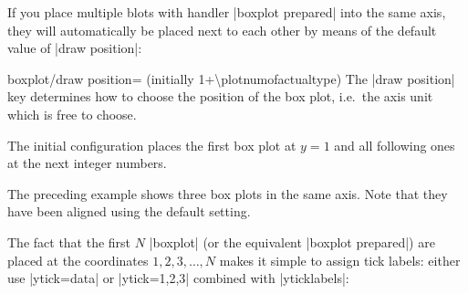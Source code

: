	If you place multiple blots with handler |boxplot prepared| into the same axis, they will automatically be placed next to each other by means of the default value of |draw position|:


\begin{pgfplotskey}{boxplot/draw position= (initially 1+\textbackslash plotnumofactualtype)}
	The |draw position| key determines how to choose the position of the box plot, i.e.\ the axis unit which is free to choose.

	The initial configuration places the first box plot at $y=1$ and all following ones at the next integer numbers.
\begin{codeexample}[]
\end{codeexample}
	The preceding example shows three box plots in the same axis. Note that they have been aligned using the default setting.

	The fact that the first $N$ |boxplot| (or the equivalent |boxplot prepared|) are placed at the coordinates $1,2,3, \dotsc,N$ makes it simple to assign tick labels: either use |ytick=data| or |ytick=1,2,3| combined with |yticklabels|:
\begin{codeexample}[]
\end{codeexample}
\end{pgfplotskey}
